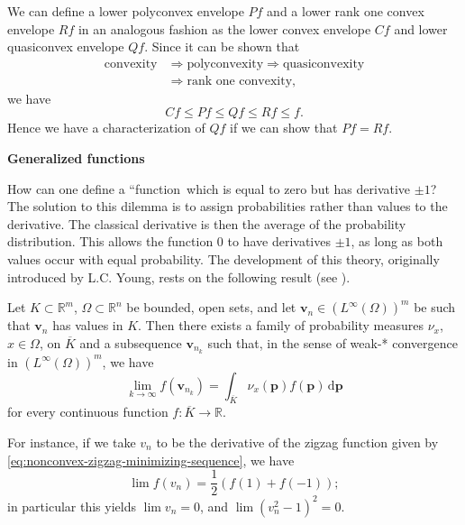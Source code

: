 We can define a lower polyconvex envelope $Pf$ and a lower rank one convex envelope $Rf$ in an analogous fashion as the lower convex envelope $Cf$ and lower quasiconvex envelope $Qf$. Since it can be shown that
\begin{equation}\label{eq:convexity-polyconvexity-quasiconvexity-rank-one-implications}
\begin{aligned}\text{convexity}&\Longrightarrow\text{polyconvexity}\Longrightarrow\text{quasiconvexity}\\&\Longrightarrow\text{rank one convexity},\end{aligned}
\end{equation}
we have
\begin{equation}\label{eq:convex-envelope-order-relations}
Cf\leq Pf\leq Qf\leq Rf\leq f.
\end{equation}
Hence we have a characterization of $Qf$ if we can show that $Pf=Rf$.

\textbf{Generalized functions}

How can one define a ``function\textquotesingle\textquotesingle\ which is equal to zero but has derivative $\pm1$? The solution to this dilemma is to assign probabilities rather than values to the derivative. The classical derivative is then the average of the probability distribution. This allows the function 0 to have derivatives $\pm1$, as long as both values occur with equal probability. The development of this theory, originally introduced by L.C. Young, rests on the following result (see \cite{Dac}).

\begin{Theorem}
\label{thm:young-measure-subsequence-existence}
Let $K\subset\mathbb{R}^m$, $\Omega\subset\mathbb{R}^n$ be bounded, open sets, and let $\bm{v}_n\in(L^\infty(\Omega))^m$ be such that $\bm{v}_n$ has values in $K$. Then there exists a family of probability measures $\nu_x$, $x\in\Omega$, on $\overline K$ and a subsequence $\bm{v}_{n_k}$ such that, in the sense of weak-* convergence in $(L^\infty(\Omega))^m$, we have
\begin{equation}\label{eq:young-measure-continuous-composition-weak-star-limit}
\lim_{k\to\infty}f(\bm{v}_{n_k})=\int_{\overline K}\nu_x(\bm{p})f(\bm{p})\,\mathrm{d}\bm{p}
\end{equation}
for every continuous function $f:\overline K\to\mathbb{R}$.
\end{Theorem}

For instance, if we take $v_n$ to be the derivative of the zigzag function given by \eqref{eq:nonconvex-zigzag-minimizing-sequence}, we have
\begin{equation}\label{eq:zigzag-derivative-young-measure-composition-limit}
\lim f(v_n)=\dfrac{1}{2}(f(1)+f(-1));
\end{equation}
in particular this yields $\lim v_n=0$, and $\lim(v_n^2-1)^2=0$.

